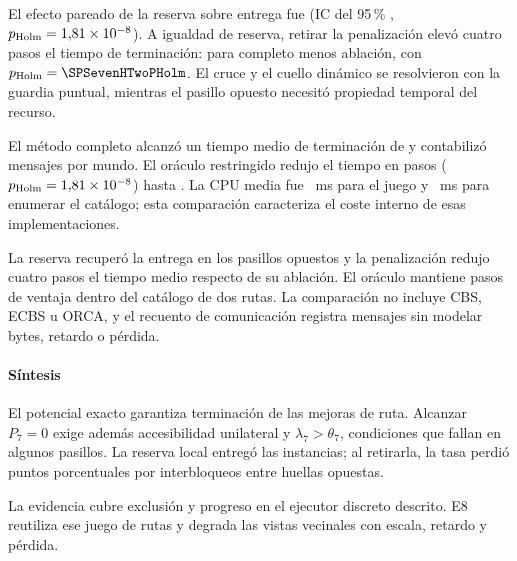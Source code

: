 El efecto pareado de la reserva sobre entrega fue \SPSevenHOneEffect{} (IC del 95\,\% \SPSevenHOneCI{}, $p_{\mathrm{Holm}}=1{,}81\times10^{-8}$). A igualdad de reserva, retirar la penalización elevó cuatro pasos el tiempo de terminación: \SPSevenHTwoEffect{} para completo menos ablación, con $p_{\mathrm{Holm}}=\SPSevenHTwoPHolm$. El cruce y el cuello dinámico se resolvieron con la guardia puntual, mientras el pasillo opuesto necesitó propiedad temporal del recurso.


El método completo alcanzó un tiempo medio de terminación de \SPSevenProposedMakespan{} y contabilizó \SPSevenProposedMessages{} mensajes por mundo. El oráculo restringido redujo el tiempo en \SPSevenHThreeEffect{} pasos ($p_{\mathrm{Holm}}=1{,}81\times10^{-8}$) hasta \SPSevenOracleMakespan{}. La CPU media fue \SPSevenProposedRuntime{}~ms para el juego y \SPSevenOracleRuntime{}~ms para enumerar el catálogo; esta comparación caracteriza el coste interno de esas implementaciones.

La reserva recuperó la entrega en los pasillos opuestos y la penalización redujo cuatro pasos el tiempo medio respecto de su ablación. El oráculo mantiene \SPSevenHThreeEffect{} pasos de ventaja dentro del catálogo de dos rutas. La comparación no incluye CBS, ECBS u ORCA, y el recuento de comunicación registra mensajes sin modelar bytes, retardo o pérdida.

\paragraph{Síntesis}

El potencial exacto garantiza terminación de las mejoras de ruta. Alcanzar $P_7=0$ exige además accesibilidad unilateral y $\lambda_7>\theta_7$, condiciones que fallan en algunos pasillos. La reserva local entregó las \SPSevenWorlds{} instancias; al retirarla, la tasa perdió \SPSevenHOneEffectPP{} puntos porcentuales por interbloqueos entre huellas opuestas.

La evidencia cubre exclusión y progreso en el ejecutor discreto descrito. E8 reutiliza ese juego de rutas y degrada las vistas vecinales con escala, retardo y pérdida.

